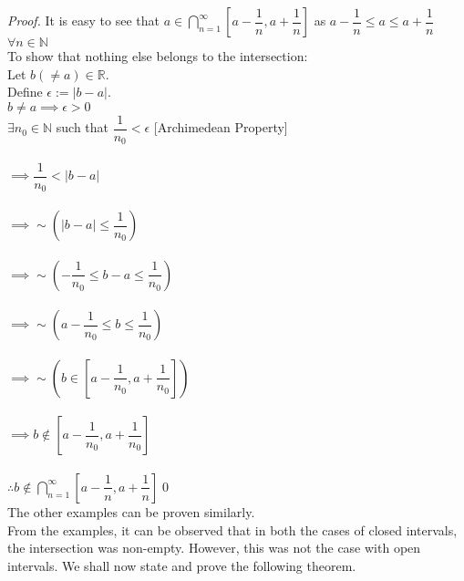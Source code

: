 \textit{Proof.} It is easy to see that $a\in\displaystyle \bigcap_{n=1}^\infty \left[a - \dfrac{1}{n}, a+\dfrac{1}{n}\right]$ as $a-\dfrac{1}{n} \le a \le a+\dfrac{1}{n}$ $\forall n \in \mathbb{N}$\\
To show that nothing else belongs to the intersection:\\
Let $b (\neq a) \in \mathbb{R}$.\\
Define $\epsilon := |b-a|$.\\
$b\neq a\implies \epsilon > 0$\\
$\exists n_0 \in\mathbb{N}$ such that $\dfrac{1}{n_0} < \epsilon$ \hfill [Archimedean Property]\\~\\
$\implies \dfrac{1}{n_0} < |b-a|$\\~\\
$\implies \sim\left(|b-a| \le \dfrac{1}{n_0}\right)$\\~\\
$\implies \sim\left(-\dfrac{1}{n_0} \le b-a \le \dfrac{1}{n_0}\right)$\\~\\
$\implies \sim\left(a-\dfrac{1}{n_0}\le b \le \dfrac{1}{n_0}\right)$\\~\\
$\implies \sim\left(b\in\left[a-\dfrac{1}{n_0}, a + \dfrac{1}{n_0}\right]\right)$\\~\\
$\implies b \not \in \left[a-\dfrac{1}{n_0}, a+\dfrac{1}{n_0}\right]$\\~\\
$\therefore b\not\in\displaystyle \bigcap_{n=1}^\infty \left[a - \dfrac{1}{n}, a+\dfrac{1}{n}\right]$\hfill\qed\\
The other examples can be proven similarly.\\
From the examples, it can be observed that in both the cases of closed intervals, the intersection was non-empty. However, this was not the case with open intervals. We shall now state and prove the following theorem.
